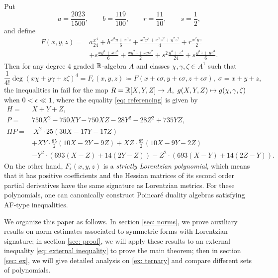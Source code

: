 \begin{example}\label{ex: ternary}
    Put
\[
        a=\frac{2023}{1500},\qquad
        b=\frac{119}{100},\qquad
        r=\frac{11}{10},\qquad
        s=\frac12,
\]
and define
\[
\begin{aligned}
F(x,y,z)={}&
 a\frac{x^4}{24}
+b\frac{x^3y+x^3z}{6}
+\frac{x^2y^2+x^2z^2+y^2z^2}{4}
+r\frac{x^2yz}{2}                                      \\
&+s\frac{xy^3+xz^3}{6}
+\frac{xy^2z+xyz^2}{2}
+s^2\frac{y^4+z^4}{24}
+s\frac{y^3z+yz^3}{6}.
\end{aligned}
\]
Then for any degree $4$ graded $\mathbb{R}$-algebra $A$ and classes $\chi,\gamma,\zeta\in A^1$ such that
\[
    \frac{1}{4!}\deg(x\chi+y\gamma+z\zeta)^4=F_\epsilon(x,y,z)\coloneqq F(x+\epsilon\sigma,y+\epsilon\sigma,z+\epsilon\sigma),\; \sigma=x+y+z,
\]
the inequalities in  fail for the map $R=\mathbb{R}[X,Y,Z]\to A,\ g(X,Y,Z)\mapsto g(\chi,\gamma,\zeta)$ when $0<\epsilon\ll 1$, where the equality \eqref{eq: referencing} is given by
\begin{align*}
    H  =& X+Y+Z,\\
    P  =& 750X^2-750XY-750XZ-28Y^2-28Z^2+735YZ,\\
    HP =&
        \ X^2\cdot 25(30X-17Y-17Z)\\
        &+XY\cdot \frac{85}{2}(10X-2Y-9Z)+XZ\cdot \frac{85}{2}(10X-9Y-2Z)\tag {1'}\label{eq: referencing'}\\
        &-Y^2\cdot (693(X-Z)+14(2Y-Z))-Z^2\cdot(693(X-Y)+14(2Z-Y)).
\end{align*}
On the other hand, $F_\epsilon(x,y,z)$ is a \textit{strictly Lorentzian polynomial}, which means that it has positive coefficients and the Hessian matrices of its second order partial derivatives have the same signature as Lorentzian metrics. For these polynomials, one can canonically construct Poincar\'e duality algebras satisfying AF-type inequalities.
\end{example}

We organize this paper as follows. In section \ref{sec: norms}, we prove auxiliary results on norm estimates associated to symmetric forms with Lorentzian signature; in section \ref{sec: proof}, we will apply these results to an external inequality \eqref{eq: external inequality} to prove the main theorem; then in section \ref{sec: ex}, we will give detailed analysis on \cref{ex: ternary} and compare different sets of polynomials.
